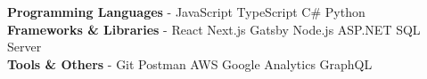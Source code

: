 \documentclass[9pt]{resume} %
\begin{document}
\vspace{0.5cm}



	




\textbf{Programming Languages} - JavaScript\slashsep
	TypeScript\slashsep
	C\#\slashsep
	Python\\
\textbf{Frameworks \& Libraries} - React\slashsep
	Next.js\slashsep
	Gatsby\slashsep
	Node.js\slashsep
	ASP.NET\slashsep
	SQL Server\\
\textbf{Tools \& Others} - Git\slashsep
 	Postman\slashsep
 	AWS\slashsep
 	Google Analytics\slashsep
 	GraphQL\\

\end{document}
